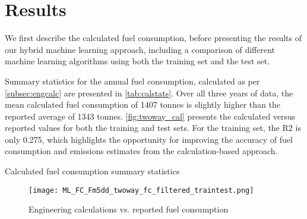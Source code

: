\section{Results}\label{sec:MLresults}
We first describe the calculated fuel consumption, before presenting the results of our hybrid machine learning approach, including a comparison of different machine learning algorithms using both the training set and the test set.

Summary statistics for the annual fuel consumption, calculated as per \autoref{subsec:engcalc} are presented in \autoref{tab:calstats}. Over all three years of data, the mean calculated fuel consumption of 1407 tonnes is slightly higher than the reported average of 1343 tonnes. \autoref{fig:twoway_cal} presents the calculated versus reported values for both the training and test sets. For the training set, the \ac{R2} is only 0.275, which highlights the opportunity for improving the accuracy of fuel consumption and emissions estimates from the calculation-based approach.

\begin{table}
    \centering
    \begin{threeparttable}
        \caption{Calculated fuel consumption summary statistics}
        \label{tab:calstats}
        
    \end{threeparttable}
\end{table}

\begin{figure}
    \centering
    \texttt{[image: ML\_FC\_Fm5dd\_twoway\_fc\_filtered\_traintest.png]}
    \caption{Engineering calculations vs. reported fuel consumption}
    \label{fig:twoway_cal}
\end{figure}

